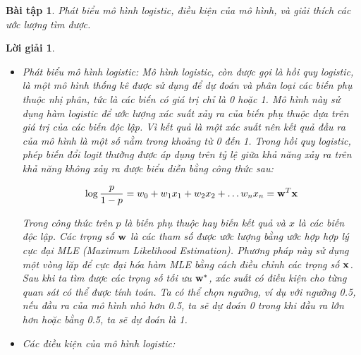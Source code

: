 \documentclass[14pt, a4paper]{article}
\theoremstyle{sltheorem}
\newtheorem{baitap}{Bài tập}
\theoremstyle{soltheorem}
\newtheorem*{loigiai}{Lời giải}
\begin{document}
\begin{baitap}
    Phát biểu mô hình logistic, điều kiện của mô hình, và giải thích các ước lượng tìm được.
\end{baitap}

\begin{loigiai}
    \begin{itemize}
        \item Phát biểu mô hình logistic:
        Mô hình logistic, còn được gọi là hồi quy logistic, là một mô hình thống kê được sử dụng để dự đoán và phân loại các biến phụ thuộc nhị phân, tức là các biến có giá trị chỉ là 0 hoặc 1. 
        Mô hình này sử dụng hàm logistic để ước lượng xác suất xảy ra của biến phụ thuộc dựa trên giá trị của các biến độc lập.
        Vì kết quả là một xác suất nên kết quả đầu ra của mô hình là một số nằm trong khoảng từ 0 đến 1.
        Trong hồi quy logistic, phép biến đổi logit thường được áp dụng trên tỷ lệ giữa khả năng xảy ra trên khả năng không xảy ra được biểu diễn bằng công thức sau:

        \begin{equation*}
            \log \dfrac{p}{1-p} = w_0 +  w_1 x_1 + w_2 x_2 + \dots w_n x_n = \bold{w}^T \bold{x}
        \end{equation*}

        Trong công thức trên $p$ là biến phụ thuộc hay biến kết quả và $x$ là các biến độc lập.
        Các trọng số $\bold{w}$ là các tham số được ước lượng bằng ước hợp hợp lý cực đại MLE (Maximum Likelihood Estimation).
        Phương pháp này sử dụng một vòng lặp để cực đại hóa hàm MLE bằng cách điều chỉnh các trọng số $\bold{x}$.
        Sau khi ta tìm được các trọng số tối ưu $\bold{w}^*$, xác suất có điều kiện cho từng quan sát có thể được tính toán.
        Ta có thể chọn ngưỡng, ví dụ với ngưỡng 0.5, nếu đầu ra của mô hình nhỏ hơn 0.5, ta sẽ dự đoán 0 trong khi đầu ra lớn hơn hoặc bằng 0.5, ta sẽ dự đoán là 1.

        \item Các điều kiện của mô hình logistic:
        

\end{itemize}
\end{loigiai}
\end{document}
